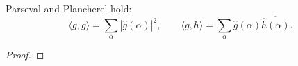 \begin{theorem}
\label{lem:ff-parseval-plancherel}
\leanok
Parseval and Plancherel hold:
  \[
    \langle g,g\rangle = \sum_\alpha |\widehat g(\alpha)|^2,
    \qquad
    \langle g,h\rangle = \sum_\alpha \widehat g(\alpha)\overline{\widehat h(\alpha)}.
  \]
\end{theorem}
\begin{proof}
\end{proof}
